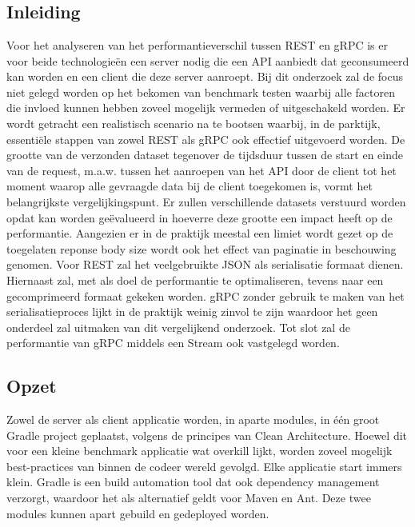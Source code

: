 
\chapter{}%
\label{ch:methodologie}

\section{Inleiding}

Voor het analyseren van het performantieverschil tussen REST en gRPC is er voor beide technologie\"en een server nodig die een API aanbiedt dat geconsumeerd kan worden en
een client die deze server aanroept. Bij dit onderzoek zal de focus niet gelegd worden op het bekomen van benchmark testen waarbij alle factoren die invloed kunnen hebben
zoveel mogelijk vermeden of uitgeschakeld worden. Er wordt getracht een realistisch scenario na te bootsen waarbij, in de parktijk, essenti\"ele stappen van zowel REST als gRPC
ook effectief uitgevoerd worden.
De grootte van de verzonden dataset tegenover de tijdsduur tussen de start en einde van de request, m.a.w. tussen het aanroepen van het API door de client
tot het moment waarop alle gevraagde data bij de client toegekomen is, vormt het belangrijkste vergelijkingspunt.
Er zullen verschillende datasets verstuurd worden opdat kan worden ge\"evalueerd in hoeverre deze grootte een impact heeft op de performantie.
Aangezien er in de praktijk meestal een limiet wordt gezet op de toegelaten reponse body size wordt ook het effect van paginatie in beschouwing genomen.
Voor REST zal het veelgebruikte JSON als serialisatie formaat dienen. Hiernaast zal, met als doel de performantie te optimaliseren,
tevens naar een gecomprimeerd formaat gekeken worden. gRPC zonder gebruik te maken van het serialisatieproces lijkt in de praktijk weinig zinvol te zijn waardoor het geen onderdeel
zal uitmaken van dit vergelijkend onderzoek. Tot slot zal de performantie van gRPC middels een Stream ook vastgelegd worden.\\

\section{Opzet}
\label{sec:opzet}

Zowel de server als client applicatie worden, in aparte modules, in \'e\'en groot Gradle project geplaatst, volgens de principes van Clean Architecture. Hoewel dit
voor een kleine benchmark applicatie wat overkill lijkt, worden zoveel mogelijk best-practices van binnen de codeer wereld gevolgd. Elke applicatie start immers klein.
Gradle is een build automation tool dat ook dependency management verzorgt, waardoor het als alternatief geldt voor Maven en Ant. %
Deze twee modules kunnen apart gebuild en gedeployed worden.\newline
~\autocite{Gradle}\\

